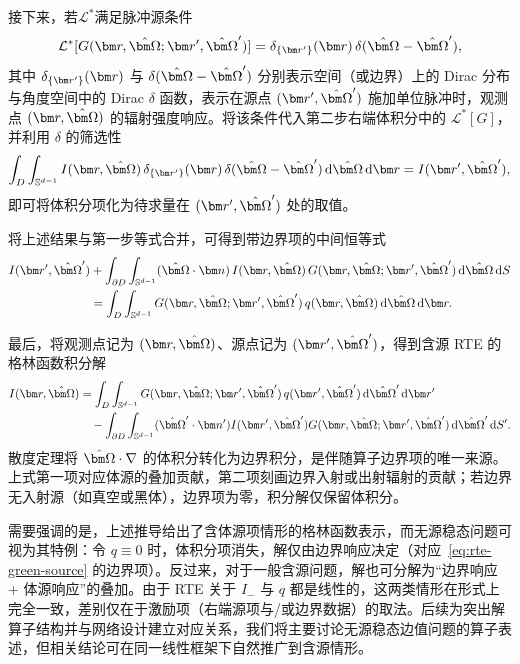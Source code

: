 接下来，若$\mathcal{L}^*$满足脉冲源条件
\begin{equation}
    \mathcal{L}^*[G(\br,\bOmega;\br',\bOmega')] = \delta_{\{\br'\}}(\br)\,\delta(\bOmega-\bOmega'),
\end{equation}
其中 $\delta_{\{\br'\}}(\br)$ 与 $\delta(\bOmega-\bOmega')$ 分别表示空间（或边界）上的 Dirac 分布与角度空间中的 Dirac $\delta$ 函数，表示在源点 $(\br',\bOmega')$ 施加单位脉冲时，观测点 $(\br,\bOmega)$ 的辐射强度响应。将该条件代入第二步右端体积分中的 $\mathcal{L}^*[G]$，并利用 $\delta$ 的筛选性
\begin{equation}
    \int_{D}\int_{\mathbb{S}^{d-1}} I(\br,\bOmega)\,\delta_{\{\br'\}}(\br)\,\delta(\bOmega-\bOmega')\diff\bOmega\diff\br
    = I(\br',\bOmega'),
\end{equation}
即可将体积分项化为待求量在 $(\br',\bOmega')$ 处的取值。

将上述结果与第一步等式合并，可得到带边界项的中间恒等式
\begin{equation}
    \begin{aligned}
        I(\br',\bOmega')
         & + \int_{\partial D}\int_{\mathbb{S}^{d-1}} (\bOmega\cdot\bn)\, I(\br,\bOmega)\, G(\br,\bOmega;\br',\bOmega')\diff\bOmega\diff S \\
         & = \int_{D}\int_{\mathbb{S}^{d-1}} G(\br,\bOmega;\br',\bOmega')\, q(\br,\bOmega)\diff\bOmega\diff\br.
    \end{aligned}
\end{equation}

最后，将观测点记为 $(\br,\bOmega)$、源点记为 $(\br',\bOmega')$，得到含源 RTE 的格林函数积分解
\begin{equation}
    \begin{aligned}
        I(\br,\bOmega)
         & = \int_{D}\int_{\mathbb{S}^{d-1}} G(\br,\bOmega;\br',\bOmega')\, q(\br',\bOmega')\diff\bOmega'\diff\br'                                  \\
         & \quad - \int_{\partial D}\int_{\mathbb{S}^{d-1}} (\bOmega'\cdot\bn') I(\br',\bOmega') G(\br,\bOmega;\br',\bOmega')\diff\bOmega'\diff S'.
    \end{aligned}\label{eq:rte-green-source}
\end{equation}
散度定理将 $\bOmega\cdot\nabla$ 的体积分转化为边界积分，是伴随算子边界项的唯一来源。上式第一项对应体源的叠加贡献，第二项刻画边界入射或出射辐射的贡献；若边界无入射源（如真空或黑体），边界项为零，积分解仅保留体积分。

需要强调的是，上述推导给出了含体源项情形的格林函数表示，而无源稳态问题可视为其特例：令 $q\equiv 0$ 时，体积分项消失，解仅由边界响应决定（对应~\eqref{eq:rte-green-source} 的边界项）。反过来，对于一般含源问题，解也可分解为“边界响应 + 体源响应”的叠加。由于 RTE 关于 $I_{-}$ 与 $q$ 都是线性的，这两类情形在形式上完全一致，差别仅在于激励项（右端源项与/或边界数据）的取法。后续为突出解算子结构并与网络设计建立对应关系，我们将主要讨论无源稳态边值问题的算子表述，但相关结论可在同一线性框架下自然推广到含源情形。

